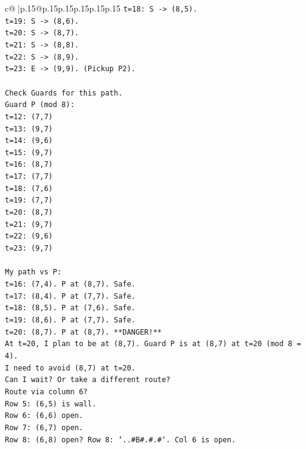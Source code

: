 \documentclass{article}
\begin{document}
{\begin{supertabular}{c@{$\;$}|p{.15\linewidth}@{}p{.15\linewidth}p{.15\linewidth}p{.15\linewidth}p{.15\linewidth}p{.15\linewidth}}
{{{\texttt{t=18: S {-}> (8,5).} \\
\texttt{t=19: S {-}> (8,6).} \\
\texttt{t=20: S {-}> (8,7).} \\
\texttt{t=21: S {-}> (8,8).} \\
\texttt{t=22: S {-}> (8,9).} \\
\texttt{t=23: E {-}> (9,9). (Pickup P2).} \\
\\ 
\texttt{Check Guards for this path.} \\
\texttt{Guard P (mod 8):} \\
\texttt{t=12: (7,7)} \\
\texttt{t=13: (9,7)} \\
\texttt{t=14: (9,6)} \\
\texttt{t=15: (9,7)} \\
\texttt{t=16: (8,7)} \\
\texttt{t=17: (7,7)} \\
\texttt{t=18: (7,6)} \\
\texttt{t=19: (7,7)} \\
\texttt{t=20: (8,7)} \\
\texttt{t=21: (9,7)} \\
\texttt{t=22: (9,6)} \\
\texttt{t=23: (9,7)} \\
\\ 
\texttt{My path vs P:} \\
\texttt{t=16: (7,4). P at (8,7). Safe.} \\
\texttt{t=17: (8,4). P at (7,7). Safe.} \\
\texttt{t=18: (8,5). P at (7,6). Safe.} \\
\texttt{t=19: (8,6). P at (7,7). Safe.} \\
\texttt{t=20: (8,7). P at (8,7). **DANGER!**} \\
\texttt{At t=20, I plan to be at (8,7). Guard P is at (8,7) at t=20 (mod 8 = 4).} \\
\texttt{I need to avoid (8,7) at t=20.} \\
\texttt{Can I wait? Or take a different route?} \\
\texttt{Route via column 6?} \\
\texttt{Row 5: (6,5) is wall.} \\
\texttt{Row 6: (6,6) open.} \\
\texttt{Row 7: (6,7) open.} \\
\texttt{Row 8: (6,8) open? Row 8: `..\#B\#.\#.\#`. Col 6 is open.} \\
}}}
\end{supertabular}}
\end{document}
